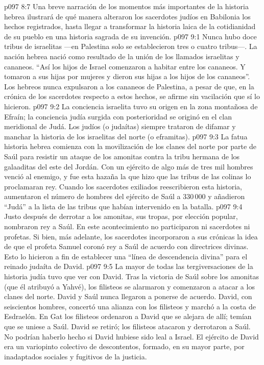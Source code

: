 \vs p097 8:7 \pc Una breve narración de los momentos más importantes de la historia hebrea ilustrará de qué manera alteraron los sacerdotes judíos en Babilonia los hechos registrados, hasta llegar a transformar la historia laica de la cotidianidad de su pueblo en una historia sagrada de su invención.
\vs p097 9:1 Nunca hubo doce tribus de israelitas ---en Palestina solo se establecieron tres o cuatro tribus---. La nación hebrea nació como resultado de la unión de los llamados israelitas y cananeos. “Así los hijos de Israel comenzaron a habitar entre los cananeos. Y tomaron a sus hijas por mujeres y dieron sus hijas a los hijos de los cananeos”. Los hebreos nunca expulsaron a los cananeos de Palestina, a pesar de que, en la crónica de los sacerdotes respecto a estos hechos, se afirme sin vacilación que sí lo hicieron.
\vs p097 9:2 La conciencia israelita tuvo su origen en la zona montañosa de Efraín; la conciencia judía surgida con posterioridad se originó en el clan meridional de Judá. Los judíos (o judaítas) siempre trataron de difamar y manchar la historia de los israelitas del norte (o eframitas).
\vs p097 9:3 \pc La fatua historia hebrea comienza con la movilización de los clanes del norte por parte de Saúl para resistir un ataque de los amonitas contra la tribu hermana de los galaaditas del este del Jordán. Con un ejército de algo más de tres mil hombres venció al enemigo, y fue esta hazaña la que hizo que las tribus de las colinas lo proclamaran rey. Cuando los sacerdotes exiliados reescribieron esta historia, aumentaron el número de hombres del ejército de Saúl a 330\,000 y añadieron “Judá” a la lista de las tribus que habían intervenido en la batalla.
\vs p097 9:4 Justo después de derrotar a los amonitas, sus tropas, por elección popular, nombraron rey a Saúl. En este acontecimiento no participaron ni sacerdotes ni profetas. Si bien, más adelante, los sacerdotes incorporaron a sus crónicas la idea de que el profeta Samuel coronó rey a Saúl de acuerdo con directrices divinas. Esto lo hicieron a fin de establecer una “línea de descendencia divina” para el reinado judaíta de David.
\vs p097 9:5 La mayor de todas las tergiversaciones de la historia judía tuvo que ver con David. Tras la victoria de Saúl sobre los amonitas (que él atribuyó a Yahvé), los filisteos se alarmaron y comenzaron a atacar a los clanes del norte. David y Saúl nunca llegaron a ponerse de acuerdo. David, con seiscientos hombres, concertó una alianza con los filisteos y marchó a la costa de Esdraelón. En Gat los filisteos ordenaron a David que se alejara de allí; temían que se uniese a Saúl. David se retiró; los filisteos atacaron y derrotaron a Saúl. No podrían haberlo hecho si David hubiese sido leal a Israel. El ejército de David era un variopinto colectivo de descontentos, formado, en su mayor parte, por inadaptados sociales y fugitivos de la justicia.
